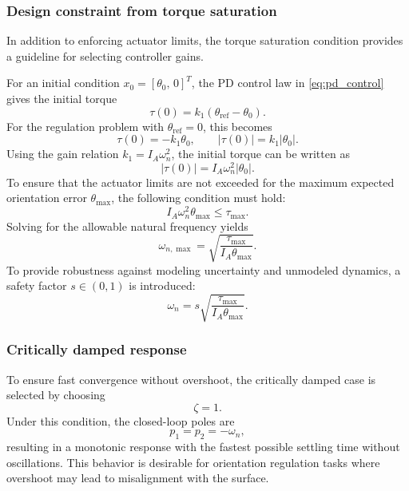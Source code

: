 \documentclass[journal]{IEEEtran}
\begin{document}
\subsubsection{Design constraint from torque saturation}

In addition to enforcing actuator limits, the torque saturation condition provides a guideline for selecting controller gains.

For an initial condition $x_0 = [\theta_0,\,0]^T$, the PD control law in \eqref{eq:pd_control} gives the initial torque
%
\begin{equation}
\tau(0) = k_1 (\theta_{\mathrm{ref}} - \theta_0).
\end{equation}
%
For the regulation problem with $\theta_{\mathrm{ref}} = 0$, this becomes
%
\begin{equation}
\tau(0) = -k_1 \theta_0,
\qquad
|\tau(0)| = k_1 |\theta_0|.
\end{equation}
%
Using the gain relation $k_1 = I_A \omega_n^2$, the initial torque can be written as
%
\begin{equation}
|\tau(0)| = I_A \omega_n^2 |\theta_0|.
\end{equation}
%
To ensure that the actuator limits are not exceeded for the maximum expected orientation error $\theta_{\max}$, the following condition must hold:
%
\begin{equation}
I_A \omega_n^2 \theta_{\max} \le \tau_{\max}.
\end{equation}
%
Solving for the allowable natural frequency yields
%
\begin{equation}
\omega_{n,\max} = \sqrt{\frac{\tau_{\max}}{I_A \theta_{\max}}}.
\end{equation}
%
To provide robustness against modeling uncertainty and unmodeled dynamics, a safety factor $s \in (0,1)$ is introduced:
%
\begin{equation}
\omega_n = s \sqrt{\frac{\tau_{\max}}{I_A \theta_{\max}}}.
\end{equation}
\subsubsection{Critically damped response}

To ensure fast convergence without overshoot, the critically damped case is selected by choosing
%
\begin{equation}
\zeta = 1.
\end{equation}
%
Under this condition, the closed-loop poles are
%
\begin{equation}
p_1 = p_2 = -\omega_n,
\end{equation}
%
resulting in a monotonic response with the fastest possible settling time without oscillations. This behavior is desirable for orientation regulation tasks where overshoot may lead to misalignment with the surface.
\end{document}
